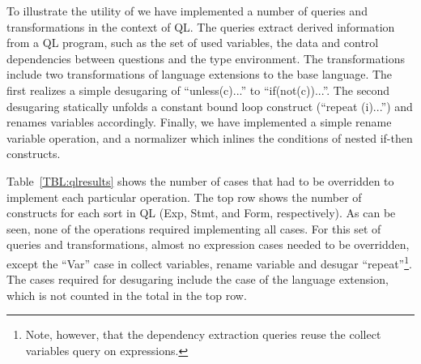To illustrate the utility of \name we have implemented a number of queries and transformations in the context of QL. The queries extract derived information from a QL program, such as the set of used variables, the data and control dependencies between questions and the type environment.
The transformations include two transformations of language extensions to the base language.
The first realizes a simple desugaring of ``unless(c){...}'' to ``if(not(c)){...}''.
The second desugaring statically unfolds a constant bound loop construct (``repeat (i){...}'') and renames variables accordingly.
Finally, we have implemented a simple rename variable operation, and a normalizer which inlines the conditions of nested if-then constructs.  

Table~\ref{TBL:qlresults} shows the number of cases that had to be overridden to implement each particular operation. The top row shows the number of  constructs for each sort in QL (Exp, Stmt, and Form, respectively).
As can be seen, none of the operations required implementing all cases.
For this set of queries and transformations, almost no expression cases needed to be overridden, except the ``Var'' case in collect variables, rename variable and desugar ``repeat''\footnote{Note, however, that the dependency extraction queries reuse the collect variables query on expressions.}.
The cases required for desugaring include the case of the language extension, which is not counted in the total in the top row. 


